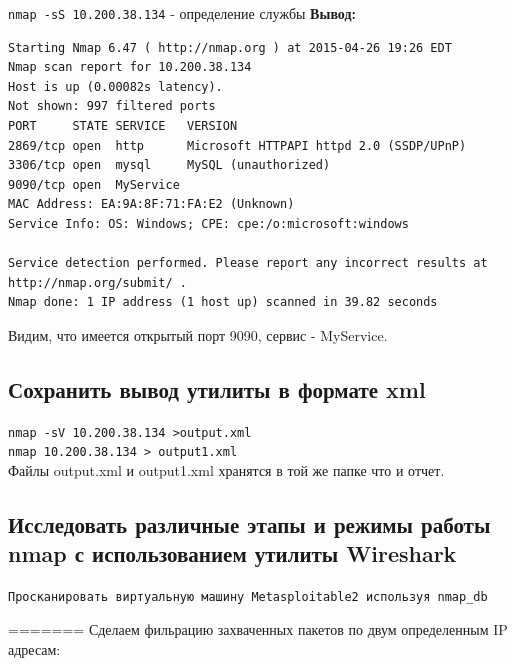 \documentclass[12pt,a4paper]{article}
\begin{document}
\verb+nmap -sS 10.200.38.134+ - определение службы
\textbf{Вывод:}
\begin{lstlisting}
Starting Nmap 6.47 ( http://nmap.org ) at 2015-04-26 19:26 EDT
Nmap scan report for 10.200.38.134
Host is up (0.00082s latency).
Not shown: 997 filtered ports
PORT     STATE SERVICE   VERSION
2869/tcp open  http      Microsoft HTTPAPI httpd 2.0 (SSDP/UPnP)
3306/tcp open  mysql     MySQL (unauthorized)
9090/tcp open  MyService
MAC Address: EA:9A:8F:71:FA:E2 (Unknown)
Service Info: OS: Windows; CPE: cpe:/o:microsoft:windows

Service detection performed. Please report any incorrect results at http://nmap.org/submit/ .
Nmap done: 1 IP address (1 host up) scanned in 39.82 seconds

\end{lstlisting}
Видим, что имеется открытый порт 9090, сервис - MyService.
\subsection{Сохранить вывод утилиты в формате xml}
\verb+nmap -sV 10.200.38.134 >output.xml+\\
\verb+nmap 10.200.38.134 > output1.xml+\\
Файлы output.xml и output1.xml хранятся в той же папке что и отчет.

\subsection{Исследовать различные этапы и режимы работы nmap с использованием утилиты Wireshark}

\verb+Просканировать виртуальную машину Metasploitable2 используя nmap_db +

=======
Сделаем фильрацию захваченных пакетов по двум определенным IP адресам:
\end{document}
